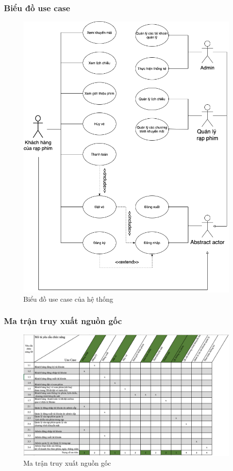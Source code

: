 \documentclass[a4paper, 12pt]{article}
\begin{document}
    \subsubsection{Biểu đồ use case}
    \begin{figure}[H]
        \includegraphics[scale = 0.6]{./UsecaseDiagram/usecase.png}
        \caption{Biểu đồ use case của hệ thống}
    \end{figure}

    \subsubsection{Ma trận truy xuất nguồn gốc}
    \begin{figure}[H]
        \includegraphics[angle=90,scale = 0.8]{TraceMatrix/traceMatrix.png}
        \caption{Ma trận truy xuất nguồn gốc}
    \end{figure}
\end{document}
